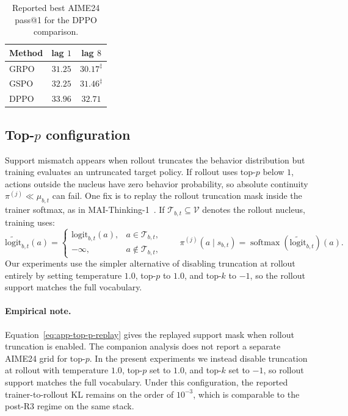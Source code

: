\begin{table}[h]
\centering
\caption{Reported best AIME24 pass@1 for the DPPO comparison.}
\label{tab:app-exp-dppo}
\small
\begin{tabular}{@{}lcc@{}}
\toprule
Method & lag $1$ & lag $8$ \\
\midrule
GRPO & $31.25$ & $30.17^{\ddagger}$ \\
GSPO & $32.25$ & $31.46^{\ddagger}$ \\
DPPO & $33.96$ & $32.71$ \\
\bottomrule
\end{tabular}
\end{table}

\subsection{Top-$p$ configuration}
\label{app:topp}

Support mismatch appears when rollout truncates the behavior distribution but training evaluates an untruncated target policy. If rollout uses top-$p$ below $1$, actions outside the nucleus have zero behavior probability, so absolute continuity $\pi^{(j)}\ll\mu_{b,t}$ can fail. One fix is to replay the rollout truncation mask inside the trainer softmax, as in MAI-Thinking-1~\citep{microsoft2025mai}. If $\mathcal T_{b,t}\subseteq\mathcal V$ denotes the rollout nucleus, training uses:
\begin{equation}
\tilde{\mathrm{logit}}_{b,t}(a)=
\begin{cases}
\mathrm{logit}_{b,t}(a), & a\in\mathcal T_{b,t},\\
-\infty, & a\notin\mathcal T_{b,t},
\end{cases}
\qquad
\pi^{(j)}(a\mid s_{b,t})=\operatorname{softmax}(\tilde{\mathrm{logit}}_{b,t})(a).
\label{eq:app-top-p-replay}
\end{equation}
Our experiments use the simpler alternative of disabling truncation at rollout entirely by setting temperature $1.0$, top-$p$ to $1.0$, and top-$k$ to $-1$, so the rollout support matches the full vocabulary.

\paragraph{Empirical note.}
Equation~\eqref{eq:app-top-p-replay} gives the replayed support mask when rollout truncation is enabled. The companion analysis does not report a separate AIME24 grid for top-$p$. In the present experiments we instead disable truncation at rollout with temperature $1.0$, top-$p$ set to $1.0$, and top-$k$ set to $-1$, so rollout support matches the full vocabulary. Under this configuration, the reported trainer-to-rollout KL remains on the order of $10^{-3}$, which is comparable to the post-R3 regime on the same stack.

